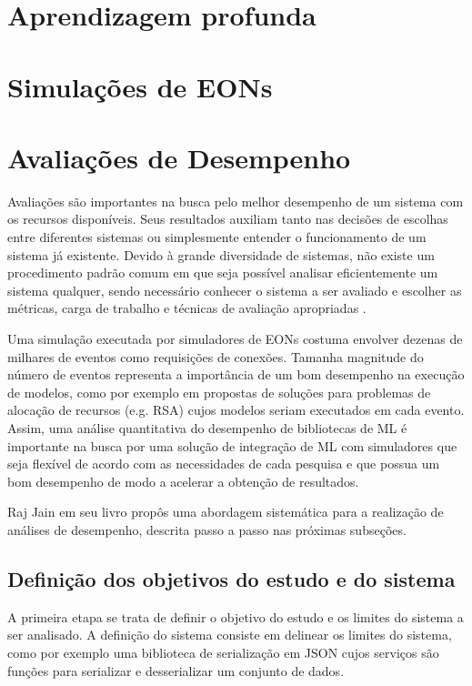 \section{Aprendizagem profunda}


\section{Simulações de EONs}%
\label{ft_eon}

\section{Avaliações de Desempenho}
\label{performance_analysis_theory}

Avaliações são importantes na busca pelo melhor desempenho de um sistema com os recursos disponíveis. Seus resultados auxiliam tanto nas decisões de escolhas entre diferentes sistemas ou simplesmente entender o funcionamento de um sistema já existente. Devido à grande diversidade de sistemas, não existe um procedimento padrão comum em que seja possível analisar eficientemente um sistema qualquer, sendo necessário conhecer o sistema a ser avaliado e escolher as métricas, carga de trabalho e técnicas de avaliação apropriadas \cite{jain1991art}.

Uma simulação executada por simuladores de EONs costuma envolver dezenas de milhares de eventos como requisições de conexões. Tamanha magnitude do número de eventos representa a importância de um bom desempenho na execução de modelos, como por exemplo em propostas de soluções para problemas de alocação de recursos (e.g. RSA) cujos modelos seriam executados em cada evento. Assim, uma análise quantitativa do desempenho de bibliotecas de ML é importante na busca por uma solução de integração de ML com simuladores que seja flexível de acordo com as necessidades de cada pesquisa e que possua um bom desempenho de modo a acelerar a obtenção de resultados.

Raj Jain em seu livro \cite{jain1991art} propôs uma abordagem sistemática para a realização de análises de desempenho, descrita passo a passo nas próximas subseções.

\subsection{Definição dos objetivos do estudo e do sistema}

A primeira etapa se trata de definir o objetivo do estudo e os limites do sistema a ser analisado. A definição do sistema consiste em delinear os limites do sistema, como por exemplo uma biblioteca de serialização em JSON cujos serviços são funções para serializar e desserializar um conjunto de dados.

